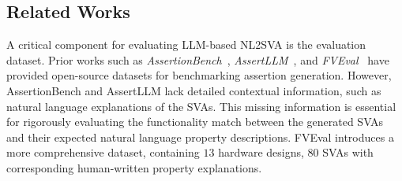 

\subsection{Related Works}
A critical component for evaluating LLM-based
NL2SVA is the evaluation dataset. 
Prior works such as \textit{AssertionBench}~\cite{Vaishnavi25}, \textit{AssertLLM}~\cite{Yan25}, and \textit{FVEval}~\cite{Minwoo24} have provided open-source
datasets for benchmarking assertion generation. 
However, AssertionBench and AssertLLM lack detailed contextual information, such as natural language explanations of the SVAs.
This missing information is essential for rigorously evaluating
the functionality match between the generated SVAs and their
expected natural language property descriptions. 
FVEval introduces a more comprehensive dataset, containing $13$ hardware
designs, $80$ SVAs with corresponding human-written property
explanations.

